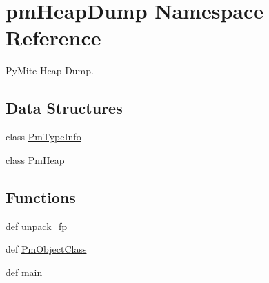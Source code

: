 \hypertarget{namespacepm_heap_dump}{\section{pm\-Heap\-Dump Namespace Reference}
\label{namespacepm_heap_dump}
}


Py\-Mite Heap Dump.  


\subsection*{Data Structures}
\begin{DoxyCompactItemize}
\item 
class \hyperlink{classpm_heap_dump_1_1_pm_type_info}{Pm\-Type\-Info}
\item 
class \hyperlink{classpm_heap_dump_1_1_pm_heap}{Pm\-Heap}
\end{DoxyCompactItemize}
\subsection*{Functions}
\begin{DoxyCompactItemize}
\item 
def \hyperlink{namespacepm_heap_dump_a17cc4242ba5cf2cd9646eedf10b2a14d}{unpack\-\_\-fp}
\item 
def \hyperlink{namespacepm_heap_dump_af14f816a7d7212b623030f423df4c311}{Pm\-Object\-Class}
\item 
def \hyperlink{namespacepm_heap_dump_a96c1840ff765ace6cfc9e619b6939e2d}{main}
\end{DoxyCompactItemize}
